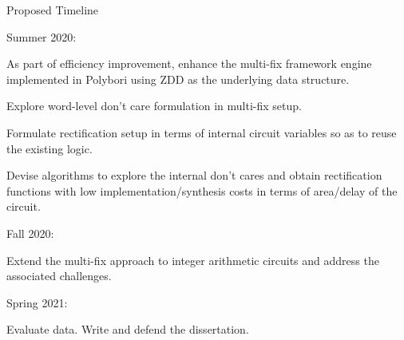 \begin{frame}{\large Proposed Timeline}
\bi
\item Summer 2020: \bi
			\item As part of efficiency improvement, enhance the multi-fix framework engine implemented in 
			Polybori using ZDD as the underlying data structure.
			\item Explore word-level don't care formulation in multi-fix setup.
			\item Formulate rectification setup in terms of internal circuit variables
					so as to reuse the existing logic. 
			\item Devise algorithms to explore the internal don't cares and obtain rectification functions with low implementation/synthesis costs in terms of area/delay of the circuit. 
			\ei
	\item Fall 2020:\bi
			\item Extend the multi-fix approach to integer arithmetic circuits and address the associated challenges.
			\ei
	\item Spring 2021:\bi
	 		\item Evaluate data. Write and defend the dissertation. 
	 		\ei
\ei
\end{frame}